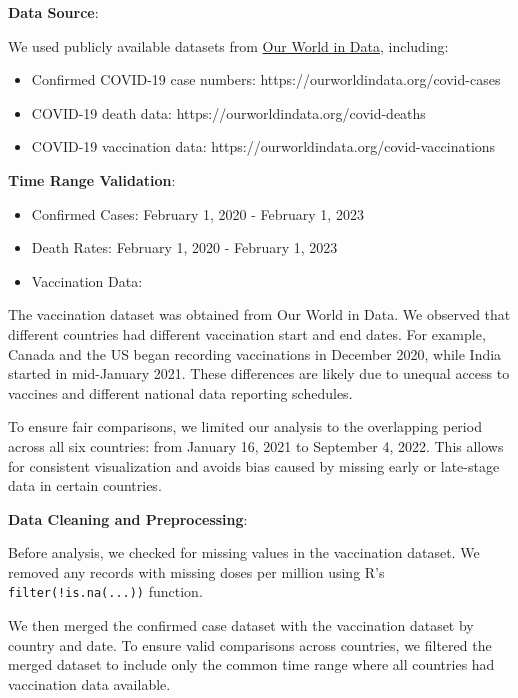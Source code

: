 \documentclass[
  11pt,
]{article}
\begin{document}
\textbf{Data Source}:

We used publicly available datasets from
\href{https://ourworldindata.org/coronavirus}{Our World in Data},
including:

\begin{itemize}
\item
  Confirmed COVID-19 case numbers:
  https://ourworldindata.org/covid-cases
\item
  COVID-19 death data: https://ourworldindata.org/covid-deaths
\item
  COVID-19 vaccination data:
  https://ourworldindata.org/covid-vaccinations
\end{itemize}

\textbf{Time Range Validation}:

\begin{itemize}
\item
  Confirmed Cases: February 1, 2020 - February 1, 2023
\item
  Death Rates: February 1, 2020 - February 1, 2023
\item
  Vaccination Data:
\end{itemize}

The vaccination dataset was obtained from Our World in Data. We observed
that different countries had different vaccination start and end dates.
For example, Canada and the US began recording vaccinations in December
2020, while India started in mid-January 2021. These differences are
likely due to unequal access to vaccines and different national data
reporting schedules.

To ensure fair comparisons, we limited our analysis to the overlapping
period across all six countries: from January 16, 2021 to September 4,
2022. This allows for consistent visualization and avoids bias caused by
missing early or late-stage data in certain countries.

\textbf{Data Cleaning and Preprocessing}:

Before analysis, we checked for missing values in the vaccination
dataset. We removed any records with missing doses per million using R's
\texttt{filter(!is.na(...))} function.

We then merged the confirmed case dataset with the vaccination dataset
by country and date. To ensure valid comparisons across countries, we
filtered the merged dataset to include only the common time range where
all countries had vaccination data available.
\end{document}
